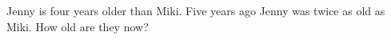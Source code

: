 Jenny is four years older than Miki. Five years ago Jenny was twice as old as Miki. How old are they now?
